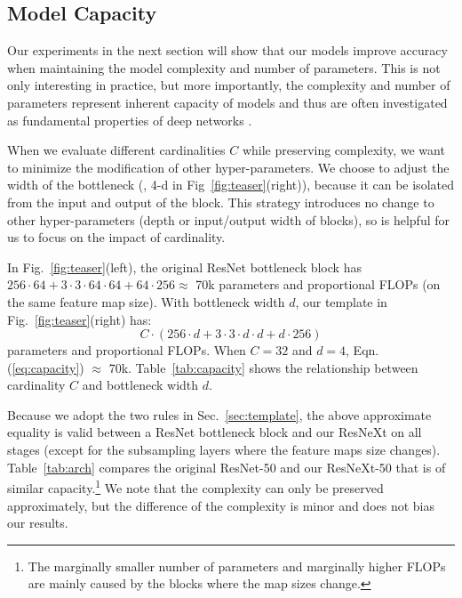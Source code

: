\documentclass[10pt,twocolumn,letterpaper]{article}
\begin{document}
\subsection{Model Capacity}
\label{sec:capacity}

Our experiments in the next section will show that our models improve accuracy when maintaining the model complexity and number of parameters. This is not only interesting in practice, but more importantly, the complexity and number of parameters represent inherent capacity of models and thus are often investigated as fundamental properties of deep networks \cite{Eigen2013a}.

When we evaluate different cardinalities $C$ while preserving complexity, we want to minimize the modification of other hyper-parameters.
We choose to adjust the width of the bottleneck (\eg, 4-d in Fig~\ref{fig:teaser}(right)), because it can be isolated from the input and output of the block. This strategy introduces no change to other hyper-parameters (depth or input/output width of blocks), so is helpful for us to focus on the impact of cardinality.

In Fig.~\ref{fig:teaser}(left), the original ResNet bottleneck block \cite{He2016} has $256\cdot64+3\cdot3\cdot64\cdot64+64\cdot256\approx $ 70k parameters and proportional FLOPs (on the same feature map size). With bottleneck width $d$, our template in Fig.~\ref{fig:teaser}(right) has:
\begin{equation}\label{eq:capacity}
C \cdot (256\cdot d + 3\cdot 3 \cdot d\cdot d + d \cdot 256)
\end{equation}
parameters and proportional FLOPs.
When $C=32$ and $d=4$, Eqn.(\ref{eq:capacity}) $\approx$ 70k. Table~\ref{tab:capacity} shows the relationship between cardinality $C$ and bottleneck width $d$.

Because we adopt the two rules in Sec.~\ref{sec:template}, the above approximate equality is valid between a ResNet bottleneck block and our ResNeXt on all stages (except for the subsampling layers where the feature maps size changes).
Table~\ref{tab:arch} compares the original ResNet-50 and our ResNeXt-50 that is of similar capacity.\footnote{The marginally smaller number of parameters and marginally higher FLOPs are mainly caused by the blocks where the map sizes change.}
We note that the complexity can only be preserved approximately, but the difference of the complexity is minor and does not bias our results.
\end{document}
